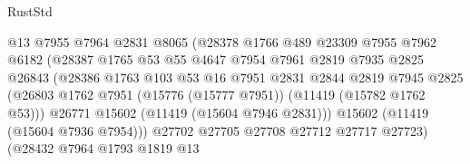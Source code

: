 \begin{lexlean}{RustStd}
\begin{coremodule}
                                    @13
                                    @7955
                                    @7964
                                    @2831
                                    @8065
                                    (@28378
                                      @1766
                                      @489
                                      @23309
                                      @7955
                                      @7962
                                      @6182
                                      (@28387
                                        @1765
                                        @53
                                        @55
                                        @4647
                                        @7954
                                        @7961
                                        @2819
                                        @7935
                                        @2825
                                        @26843
                                        (@28386
                                          @1763
                                          @103
                                          @53
                                          @16
                                          @7951
                                          @2831
                                          @2844
                                          @2819
                                          @7945
                                          @2825
                                          (@26803
                                            @1762
                                            @7951
                                            (@15776 (@15777 @7951))
                                            (@11419 (@15782 @1762 @53)))
                                          @26771
                                          @15602
                                          (@11419 (@15604 @7946 @2831)))
                                        @15602
                                        (@11419 (@15604 @7936 @7954)))
                                      @27702
                                      @27705
                                      @27708
                                      @27712
                                      @27717
                                      @27723)
                                    (@28432
                                      @7964
                                      @1793
                                      @1819
                                      @13

\end{coremodule}
\end{lexlean}
